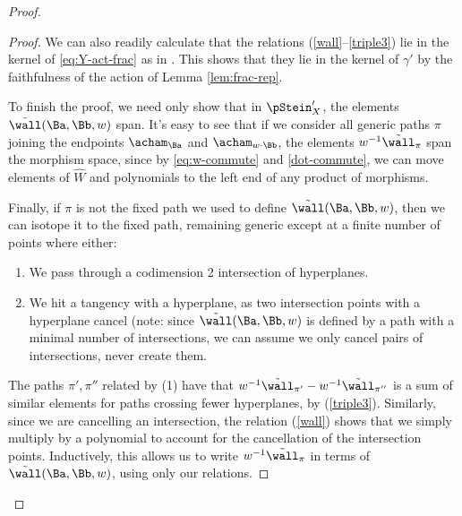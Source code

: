 \begin{proof}
\begin{proof}
 We can also readily calculate that the relations
 (\ref{wall}--\ref{triple3}) lie in the kernel of \eqref{eq:Y-act-frac}  as in \cite[Lemma
  2.10]{WebSD}.  This shows that they lie in the kernel of $\gamma'$ by
  the faithfulness of the action of  Lemma
\ref{lem:frac-rep}.  

To finish the proof, we need only show that in $\pStein_X'$, the elements
$\tilde{\wall}(\Ba,\Bb,w)$ span.  It's easy to see that if we consider
all generic paths $\pi$ joining the endpoints $\acham_{\Ba}$ and
$\acham_{w\cdot \Bb}$, the elements   $w^{-1}\tilde{\wall}_\pi$ span
the morphism space, since by \eqref{eq:w-commute} and
\eqref{dot-commute}, we can move elements of $\widehat{W}$ and
polynomials to the left end of any product of morphisms.

Finally, if $\pi$ is not the fixed path we used to define
$\tilde{\wall}(\Ba,\Bb,w)$, then we can isotope it to the fixed path,
remaining generic except at a finite number of points where either:
\begin{enumerate}
\item We pass through a codimension 2 intersection of hyperplanes.
\item We hit a tangency with a hyperplane, as two intersection points with
  a hyperplane cancel (note: since $\tilde{\wall}(\Ba,\Bb,w)$ is
  defined by a path with a minimal number of intersections, we can
  assume we only cancel pairs of intersections, never create them.
\end{enumerate}
The paths $\pi',\pi''$ related by (1) have that
$w^{-1}\tilde{\wall}_{\pi'}-w^{-1}\tilde{\wall}_{\pi''}$ is a sum of
similar elements for paths crossing fewer hyperplanes, by
(\ref{triple3}).  Similarly, since we are cancelling an intersection,
the relation (\ref{wall}) shows that we simply multiply by a
polynomial to account for the cancellation of the intersection points.
 Inductively, this allows us to write $w^{-1}\tilde{\wall}_\pi$ in
 terms of $\tilde{\wall}(\Ba,\Bb,w)$, using only our relations.  
\end{proof}


\end{proof}
